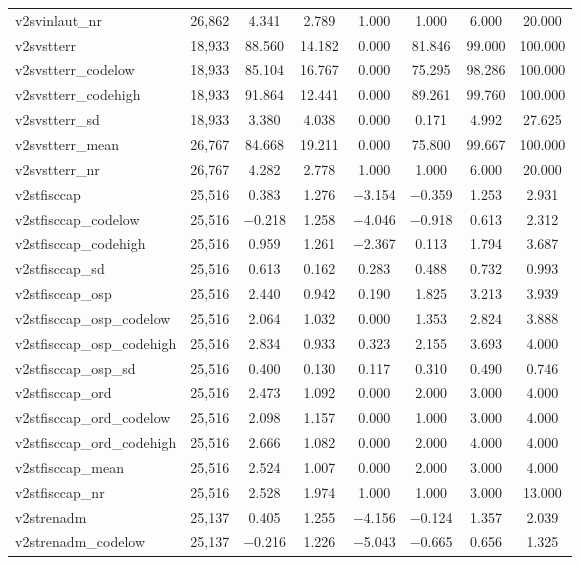 \begin{table}[!htbp]
\begin{tabular}{@{\extracolsep{5pt}}lccccccc}
v2svinlaut\_nr & 26,862 & 4.341 & 2.789 & 1.000 & 1.000 & 6.000 & 20.000 \\ 
v2svstterr & 18,933 & 88.560 & 14.182 & 0.000 & 81.846 & 99.000 & 100.000 \\ 
v2svstterr\_codelow & 18,933 & 85.104 & 16.767 & 0.000 & 75.295 & 98.286 & 100.000 \\ 
v2svstterr\_codehigh & 18,933 & 91.864 & 12.441 & 0.000 & 89.261 & 99.760 & 100.000 \\ 
v2svstterr\_sd & 18,933 & 3.380 & 4.038 & 0.000 & 0.171 & 4.992 & 27.625 \\ 
v2svstterr\_mean & 26,767 & 84.668 & 19.211 & 0.000 & 75.800 & 99.667 & 100.000 \\ 
v2svstterr\_nr & 26,767 & 4.282 & 2.778 & 1.000 & 1.000 & 6.000 & 20.000 \\ 
v2stfisccap & 25,516 & 0.383 & 1.276 & $-$3.154 & $-$0.359 & 1.253 & 2.931 \\ 
v2stfisccap\_codelow & 25,516 & $-$0.218 & 1.258 & $-$4.046 & $-$0.918 & 0.613 & 2.312 \\ 
v2stfisccap\_codehigh & 25,516 & 0.959 & 1.261 & $-$2.367 & 0.113 & 1.794 & 3.687 \\ 
v2stfisccap\_sd & 25,516 & 0.613 & 0.162 & 0.283 & 0.488 & 0.732 & 0.993 \\ 
v2stfisccap\_osp & 25,516 & 2.440 & 0.942 & 0.190 & 1.825 & 3.213 & 3.939 \\ 
v2stfisccap\_osp\_codelow & 25,516 & 2.064 & 1.032 & 0.000 & 1.353 & 2.824 & 3.888 \\ 
v2stfisccap\_osp\_codehigh & 25,516 & 2.834 & 0.933 & 0.323 & 2.155 & 3.693 & 4.000 \\ 
v2stfisccap\_osp\_sd & 25,516 & 0.400 & 0.130 & 0.117 & 0.310 & 0.490 & 0.746 \\ 
v2stfisccap\_ord & 25,516 & 2.473 & 1.092 & 0.000 & 2.000 & 3.000 & 4.000 \\ 
v2stfisccap\_ord\_codelow & 25,516 & 2.098 & 1.157 & 0.000 & 1.000 & 3.000 & 4.000 \\ 
v2stfisccap\_ord\_codehigh & 25,516 & 2.666 & 1.082 & 0.000 & 2.000 & 4.000 & 4.000 \\ 
v2stfisccap\_mean & 25,516 & 2.524 & 1.007 & 0.000 & 2.000 & 3.000 & 4.000 \\ 
v2stfisccap\_nr & 25,516 & 2.528 & 1.974 & 1.000 & 1.000 & 3.000 & 13.000 \\ 
v2strenadm & 25,137 & 0.405 & 1.255 & $-$4.156 & $-$0.124 & 1.357 & 2.039 \\ 
v2strenadm\_codelow & 25,137 & $-$0.216 & 1.226 & $-$5.043 & $-$0.665 & 0.656 & 1.325 \\ 

\end{tabular}
\end{table}

